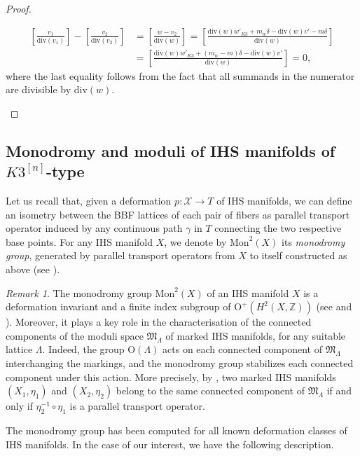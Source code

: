 \documentclass[12pt,a4paper]{amsart}
\theoremstyle{plain}
\theoremstyle{definition}
\theoremstyle{remark}
\newtheorem{rmk}[thm]{Remark}
\def\Z{\mathbb{Z}}
\def\H{H}
\newcommand{\OO}{\mathrm{O}}
\newcommand{\mon}{\mathrm{Mon}}
\begin{document}
\begin{proof}
\begin{enumerate}
\begin{align*}
                 \left[\frac{v_1}{\mathrm{div}(v_1)}\right]- \left[\frac{v_2}{\mathrm{div}(v_2)}\right]&=\left[\frac{w-v_2}{\mathrm{div}(w)}\right]=\left[\frac{\mathrm{div}(w)w'_{K3}+m_w\delta-\mathrm{div}(w)v'-m\delta}{\mathrm{div}(w)}\right]\\
                &=\left[\frac{\mathrm{div}(w)w'_{K3}+(m_w-m)\delta-\mathrm{div}(w)v'}{\mathrm{div}(w)}\right]=0,
            \end{align*}
            where the last equality follows from the fact that all summands in the numerator are divisible by $\mathrm{div}(w)$. \qedhere
        \end{enumerate}
    \end{proof}


\subsection{Monodromy and moduli of IHS manifolds of $K3^{[n]}$-type}
Let us recall that, given a deformation $p\colon \mathcal{X}\to T$ of IHS manifolds, we can define an isometry between the BBF lattices of each pair of fibers as parallel transport operator induced by any continuous path $\gamma$ in $T$ connecting the two respective base points. For any IHS manifold $X$, we denote by $\mon^2(X)$ its \textit{monodromy group}, generated by parallel transport operators from $X$ to itself constructed as above (see \cite{Mar11}).

\begin{rmk}\label{rmk_components}
    The monodromy group $\mon^2(X)$ of an IHS manifold $X$ is a deformation invariant and a finite index subgroup of $\OO^+(\H^2(X,\Z))$ (see \cite[Theorem 3.4]{Ver09} and \cite[Section 4]{Mar11}). Moreover, it plays a key role in the characterisation of the connected components of the moduli space $\mathfrak{M}_\Lambda$ of marked IHS manifolds, for any suitable lattice $\Lambda$. Indeed, the group $\OO(\Lambda)$ acts on each connected component of $\mathfrak{M}_\Lambda$ interchanging the markings, and the monodromy group stabilizes each connected component under this action. More precisely, by \cite[Lemma 7.5]{Mar11}, two marked IHS manifolds $(X_1,\eta_1)$ and $(X_2,\eta_2)$ belong to the same connected component of $\mathfrak{M}_\Lambda$ if and only if $\eta_2^{-1}\circ \eta_1$ is a parallel transport operator.
\end{rmk}
 The monodromy group has been computed for all known deformation classes of IHS manifolds. In the case of our interest, we have the following description.
\end{document}
